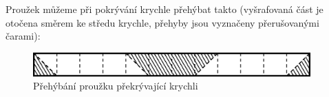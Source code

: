 \documentclass{fkssolpub}
\author{Ondřej Sedláček}
\begin{document}
Proužek můžeme při pokrývání krychle přehýbat takto (vyšrafovaná část je otočena směrem ke středu krychle, přehyby jsou vyznačeny přerušovanými čarami):

\begin{figure}[h!]
	\begin{center}
		\includegraphics[width=0.95\textwidth]{2-fig}
	\end{center}
	\caption{Přehýbání proužku překrývající krychli}
	\label{fig:1}
\end{figure}
\end{document}

